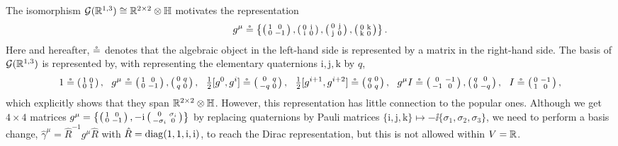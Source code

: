 \documentclass[CheatSheet]{subfiles}
\begin{document}
The isomorphism $\GeoA(\RR^{1,3})\cong\RR^{2\times2}\otimes\mathbb{H}$ motivates the representation
\begin{equation}
  g^\mu\req\left\{\spmat{1&0\\0&-1},\spmat{0&\ii\\\ii&0},\spmat{0&\mathrm{j}\\\mathrm{j}&0},\spmat{0&\mathrm{k}\\\mathrm{k}&0}\right\}.
\end{equation}
Here and hereafter, $\req$ denotes that the algebraic object in the left-hand side is represented by a matrix in the right-hand side.
The basis of $\GeoA(\RR^{1,3})$ is represented by, with representing the elementary quaternions $\mathrm{i,j,k}$ by $q$,
\[
  1\req\spmat{1&0\\0&1},~~
  g^\mu\req\spmat{1&0\\0&-1},\spmat{0&q\\q&0},~~
  \tfrac12[g^0,g^i]\req\spmat{0&q\\-q&0},~~
  \tfrac12[g^{i+1},g^{i+2}]\req\spmat{q&0\\0&q},~~
  g^\mu I\req\spmat{0&-1\\-1&0},\spmat{q&0\\0&-q},~~
  I\req\spmat{0&-1\\1&0},
\]
which explicitly shows that they span $\RR^{2\times2}\otimes\mathbb{H}$.
However, this representation has little connection to the popular ones.
Although we get $4\times4$ matrices
$
  g^\mu=\left\{\spmat{1&0\\0&-1},-\ii\spmat{0&\sigma_i\\-\sigma_i&0}\right\}
$
by replacing quaternions by Pauli matrices $\mathrm{\{i,j,k\}}\mapsto-\ii\{\sigma_1,\sigma_2,\sigma_3\}$, we need to perform a basis change, $\hat\gamma^\mu=\hat R^{-1}g^\mu \hat R$ with $\hat R=\diag(1,1,\ii,\ii)$, to reach the Dirac representation, but this is not allowed within $V=\RR$.
\end{document}
